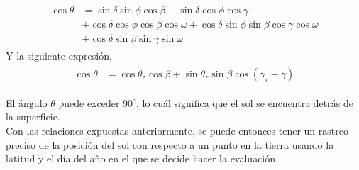 \begin{align}
	\begin{aligned}
		\cos\theta & = \sin \delta \sin \phi \cos \beta - \sin \delta \cos \phi \cos \gamma \\
		& + \cos \delta \cos \phi \cos \beta \cos \omega + \cos \delta \sin \phi \sin \beta \cos \gamma \cos \omega \\
		& + \cos \delta \sin \beta \sin \gamma \sin \omega
	\end{aligned}
\end{align}
Y la siguiente expresión,
\begin{align}
	\begin{aligned}
		\cos\theta & = \cos \theta_z \cos \beta + \sin \theta_z \sin \beta \cos\left(\gamma_s - \gamma \right) 
	\end{aligned}
\end{align}

El ángulo $\theta$ puede exceder $90^\circ$, lo cuál significa que el sol se encuentra detrás de la superficie. \\

Con las relaciones expuestas anteriormente, se puede entonces tener un rastreo preciso de la posición del sol con respecto a un punto en la tierra usando la latitud y el día del año en el que se decide hacer la evaluación.